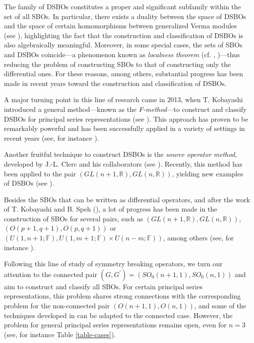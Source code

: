 \documentclass[12pt, pdflatex, a4paper]{article}
\theoremstyle{plain}
\theoremstyle{definition}
\def\R{{\mathbb R}}
\begin{document}

The family of DSBOs constitutes a proper and significant subfamily within the set of all SBOs. In particular, there exists a duality between the space of DSBOs and the space of certain homomorphisms between generalized Verma modules (see \cite[Thm. 2.9]{KP16a}), highlighting the fact that the construction and classification of DSBOs is also algebraically meaningful. Moreover, in some special cases, the sets of SBOs and DSBOs coincide—a phenomenon known as \emph{localness theorem} (cf. \cite[Thm. 5.3]{KP16a}, \cite[Thm. 3.6]{KS18})—thus reducing the problem of constructing SBOs to that of constructing only the differential ones. For these reasons, among others, substantial progress has been made in recent years toward the construction and classification of DSBOs.

A major turning point in this line of research came in 2013, when T. Kobayashi introduced a general method—known as the \emph{F-method}—to construct and classify DSBOs for principal series representations (see \cite{Kob13, Kob14}). This approach has proven to be remarkably powerful and has been successfully applied in a variety of settings in recent years  (see, for instance \cite{KKP16, KKP18, KOSS15, KP16a, KP16b, Kub24, KO25, Nak22, Per-Val23, Per-Val24}).


Another fruitful technique to construct DSBOs is the \textit{source operator method}, developed by J.-L. Clerc and his collaborators (see \cite{BC12, BSCK20, BSCK25}). Recently, this method has been applied to the pair $(GL(n+1, \R), GL(n,\R))$, yielding new examples of DSBOs (see \cite{DL25}).


Besides the SBOs that can be written as differential operators, and after the work of T. Kobayashi and B. Speh (\cite{KS15, KS18}), a lot of progress has been made in the construction of SBOs for several pairs, such as $(GL(n+1, \R), GL(n, \R))$, $(O(p+1, q+1), O(p,q+1))$ or $(U(1,n+1; \mathbb{F}), U(1,m+1; \mathbb{F}) \times U(n-m; \mathbb{F}))$, among others (see, for instance \cite{DF24, Fra23, FO19, FW19, FW20, KL18}).\medskip


Following this line of study of symmetry breaking operators, we turn our attention to the connected pair $(G,G^\prime) = (SO_0(n+1,1), SO_0(n,1))$ and aim to construct and classify all SBOs. For certain principal series representations, this problem shares strong connections with the corresponding problem for the non-connected pair $(O(n+1, 1), O(n,1))$, and some of the techniques developed in \cite{KS15, KS18} can be adapted to the connected case. However, the problem for general principal series representations remains open, even for $n=3$ (see, for instance Table \ref{table-cases}).
\end{document}
